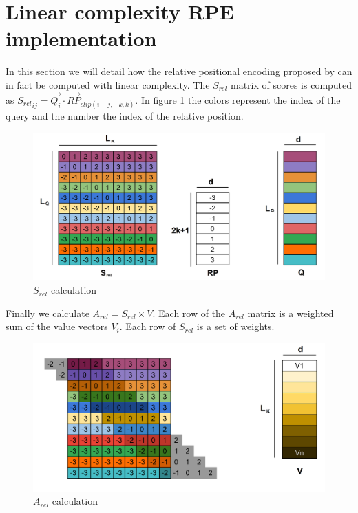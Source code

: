 \section{Linear complexity RPE
implementation}

In this section we will detail how the relative positional encoding
 proposed by \citet{shaw2018selfattention}
can in fact be computed with linear complexity. The $S_{rel}$ matrix of scores is computed as
${S_{rel}}_{ij} = \vec{Q_i} \cdotp \vec{RP}_{clip(i-j, -k, k)}$. In figure \ref{fig:S_rel} the colors represent the index of the query and the number the
index of the relative position.

\begin{figure}
\centering
\includegraphics[width=0.9\linewidth]{images/S_rel.png}
\caption{$S_{rel}$ calculation}
\label{fig:S_rel}
\end{figure}

Finally we calculate $A_{rel} = S_{rel} \times V$. Each row of the $A_{rel}$ matrix is a weighted sum of the value vectors $V_i$. Each row of $S_{rel}$ is a set of weights.

\begin{figure}
\centering
\includegraphics[width=0.9\linewidth]{images/S_rel_V.png}
\caption{$A_{rel}$ calculation}
\label{fig:A_rel_naive}
\end{figure}

